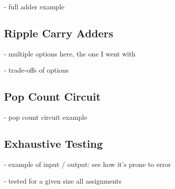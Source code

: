 - full adder example

\subsection{Ripple Carry Adders}
- multiple options here, the one I went with

- trade-offs of options

\subsection{Pop Count Circuit}
- pop count circuit example

\subsection{Exhaustive Testing}

- example of input / output: see how it's prone to error

- tested for a given size all assignments
